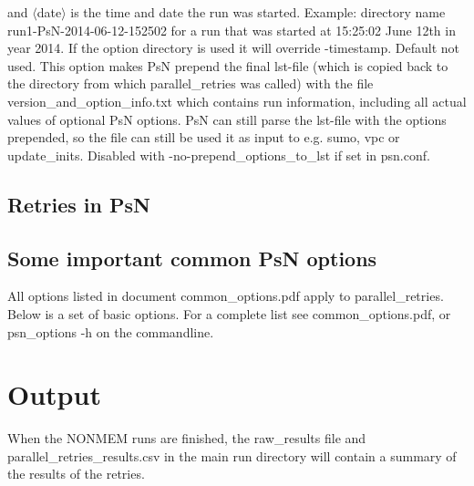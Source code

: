 \begin{optionlist}
and $\langle$date$\rangle$ is the time and date the run was started. 
Example: directory name run1-PsN-2014-06-12-152502 for a run that was started at 15:25:02 June 12th in year 2014.
If the option directory is used it will override -timestamp.
\nextopt
{}
Default not used. This option makes PsN prepend the final lst-file (which is copied back to the directory from which parallel\_retries was called) with the file version\_and\_option\_info.txt which contains run information, including     all actual values of optional PsN options. PsN can still parse the lst-file with the options prepended, so the file can still be used it as input to e.g. sumo, vpc or update\_inits. Disabled with -no-prepend\_options\_to\_lst if set in psn.conf.
\nextopt
\end{optionlist}

\subsection{Retries in PsN}


\subsection{Some important common PsN options}
All options listed in document common\_options.pdf apply to parallel\_retries. 
Below is a set of basic options. For a complete list see common\_options.pdf, 
or psn\_options -h on the commandline.


\section{Output}
When the NONMEM runs are finished, the raw\_results file 
and parallel\_retries\_results.csv
in the
main run directory will contain a summary of the results of the 
retries.


